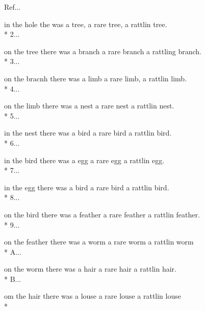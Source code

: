 \begin{SongText}
\begin{SongVerse}
        Ref...
    \end{SongVerse}
    \begin{SongVerse}
        in the hole the was a tree, a rare tree, a rattlin tree.\\*%
        2...
    \end{SongVerse}
    \begin{SongVerse}
        on the tree there was a branch a rare branch a rattling branch.\\*%
        3...
    \end{SongVerse}
    \begin{SongVerse}
        on the bracnh there was a limb a rare limb, a rattlin limb.\\*%
        4...
    \end{SongVerse}
    \begin{SongVerse}
        on the limb there was a nest a rare nest a rattlin nest.\\*%
        5...
    \end{SongVerse}
    \begin{SongVerse}
        in the nest there was a bird a rare bird a rattlin bird.\\*%
        6...
    \end{SongVerse}
    \begin{SongVerse}
        in the bird there was a egg a rare egg a rattlin egg.\\*%
        7...
    \end{SongVerse}
    \begin{SongVerse}
        in the egg there was a bird a rare bird a rattlin bird.\\*%
        8...
    \end{SongVerse}
    \begin{SongVerse}
        on the bird there was a feather a rare feather a rattlin feather.\\*%
        9...
    \end{SongVerse}
    \begin{SongVerse}
        on the feather there was a worm a rare worm a rattlin worm\\*%
        A...
    \end{SongVerse}
    \begin{SongVerse}
        on the worm there was a hair a rare hair a rattlin hair. \\*%
        B...
    \end{SongVerse}
    \begin{SongVerse}
        om the hair there was a louse a rare louse a rattlin louse\\*%

\end{SongVerse}
\end{SongText}

